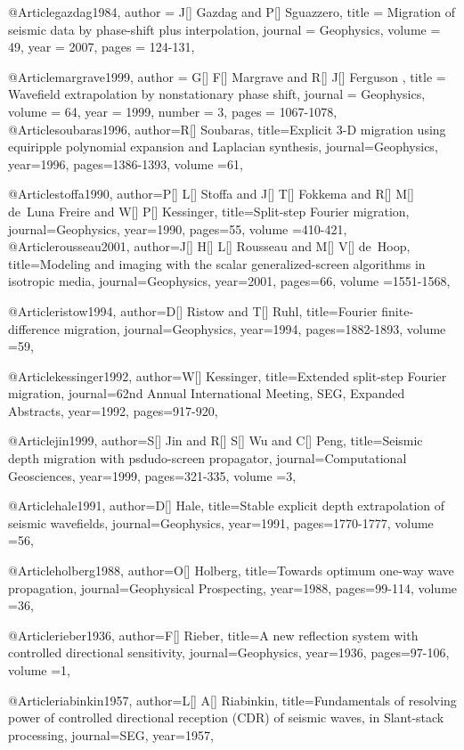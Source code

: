 {@Article{gazdag1984,
  author =	 { J[] Gazdag and P[] Sguazzero},
  title =	 { Migration of seismic data by phase-shift plus interpolation},
  journal =	 {Geophysics},
  volume =	 49,
  year =	 2007,
  pages =	 {124-131},
}

@Article{margrave1999,
  author =	 { G[] F[] Margrave and R[] J[] Ferguson },
  title =	 { Wavefield extrapolation by nonstationary phase shift},
  journal =	 {Geophysics},
  volume =	 64,
  year =	 1999,
  number =	 3,
  pages =	 {1067-1078},
}
@Article{soubaras1996,
author={R[] Soubaras},
title={Explicit 3-D migration using equiripple polynomial expansion and Laplacian synthesis},
journal={Geophysics},
year=1996,
pages={1386-1393},
volume ={61},
}

@Article{stoffa1990,
author={P[] L[] Stoffa and J[] T[] Fokkema and R[] M[] de~Luna Freire and W[] P[] Kessinger},
title={Split-step Fourier migration},
journal={Geophysics},
year=1990,
pages={55},
volume ={410-421},
}
@Article{rousseau2001,
author={J[] H[] L[] Rousseau and M[] V[] de~Hoop},
title={Modeling and imaging with the scalar generalized-screen algorithms in isotropic media},
journal={Geophysics},
year=2001,
pages={66},
volume ={1551-1568},
}

@Article{ristow1994,
author={D[] Ristow and T[] Ruhl},
title={Fourier finite-difference migration},
journal={Geophysics},
year=1994,
pages={1882-1893},
volume ={59},
}

@Article{kessinger1992,
author={W[] Kessinger},
title={Extended split-step Fourier migration},
journal={62nd Annual International Meeting, SEG, Expanded Abstracts},
year=1992,
pages={917-920},
}

@Article{jin1999,
author={S[] Jin and R[] S[] Wu and C[] Peng},
title={Seismic depth migration with psdudo-screen propagator},
journal={Computational Geosciences},
year=1999,
pages={321-335},
volume ={3},
}

@Article{hale1991,
author={D[] Hale},
title={Stable explicit depth extrapolation of seismic wavefields},
journal={Geophysics},
year=1991,
pages={1770-1777},
volume ={56},
}

@Article{holberg1988,
author={O[] Holberg},
title={Towards optimum one-way wave propagation},
journal={Geophysical Prospecting},
year=1988,
pages={99-114},
volume ={36},
}

@Article{rieber1936,
author={F[] Rieber},
title={A new reflection system with controlled directional sensitivity},
journal={Geophysics},
year=1936,
pages={97-106},
volume ={1},
}


@Article{riabinkin1957,
author={L[] A[] Riabinkin},
title={Fundamentals of resolving power of controlled directional reception (CDR) of seismic waves, in Slant-stack processing},
journal={SEG},
year=1957,
}

}
